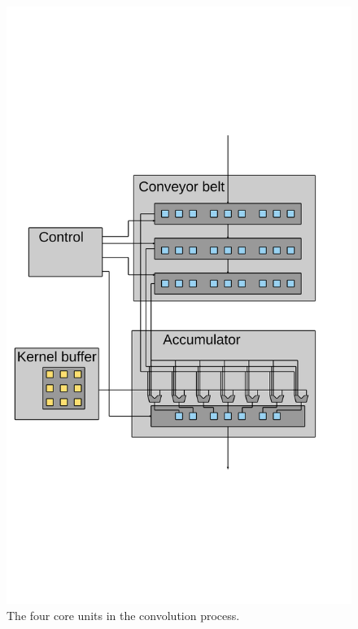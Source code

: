 \begin{Description}
\begin{figure}[h!]
    \includegraphics[width=\linewidth]{img/DaisyOverview.png}
    \caption{The four core units in the convolution process.}
    \label{fig:DaisyView}
\end{figure}


\end{Description}
